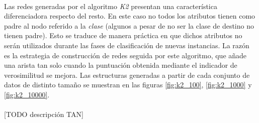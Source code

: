 \documentclass{article}
\begin{document}
			\paragraph{}
			Las redes generadas por el algoritmo \emph{K2} presentan una característica diferenciadora respecto del resto. En este caso no todos los atributos tienen como padre al nodo referido a la \emph{clase} (algunos a pesar de no ser la clase de destino no tienen padre). Esto se traduce de manera práctica en que dichos atributos no serán utilizados durante las fases de clasificación de nuevas instancias. La razón es la estrategia de construcción de redes seguida por este algoritmo, que añade una arista tan solo cuando la puntuación obtenida mediante el indicador de verosimilitud se mejora. Las estructuras generadas a partir de cada conjunto de datos de distinto tamaño se muestran en las figuras \ref{fig:k2_100}, \ref{fig:k2_1000} y \ref{fig:k2_10000}.

			\paragraph{}
			[TODO descripción TAN]
\end{document}
